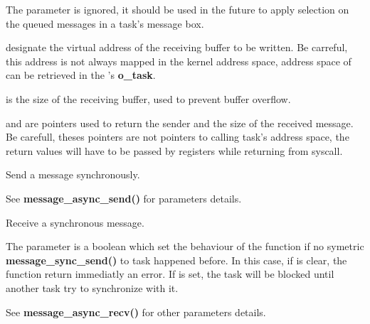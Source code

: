 \begin{itemize}
{	   \item The  parameter is ignored, it should be used in the
	   future to apply selection on the queued messages in a task's
	   message box.

	   \item {} designate the virtual address of the receiving
	   buffer to be written. Be carreful, this address is not always
	   mapped in the kernel address space, address space of 
	   can be retrieved in the 's \textbf{o\_task}.

	   \item {} is the size of the receiving buffer, used
	   to prevent buffer overflow.

	   \item {} and  are pointers used to
	   return the sender and the size of the received message. Be carefull,
	   theses pointers are not pointers to calling task's address space,
	   the return values will have to be passed by registers while
	   returning from syscall.
	 }

	 {
	   \item Send a message synchronously. 

	   \item See \textbf{message\_async\_send()} for parameters details.
	 }

	 {
	   \item Receive a synchronous message.

	   \item The  parameter is a boolean which
	   set the behaviour of the function if no symetric
	   \textbf{message\_sync\_send()} to task  
	   happened before. In this case, if 
	   is clear, the function return immediatly an error.
	   If  is set, the task 
	   will be blocked until another task try to synchronize with it.

	   \item See \textbf{message\_async\_recv()} for other parameters
	   details. 
	 }



\end{itemize}
